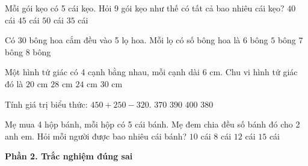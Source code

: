 \begin{ex} %
Mỗi gói kẹo có 5 cái kẹo. Hỏi 9 gói kẹo như thế có tất cả bao nhiêu cái kẹo?
\choice
{$40$ cái}
{\True $45$ cái}
{$50$ cái}
{$35$ cái}
\end{ex}

\begin{ex} %
Có 30 bông hoa cắm đều vào 5 lọ hoa. Mỗi lọ có số bông hoa là
\choice
{\True $6$ bông}
{$5$ bông}
{$7$ bông}
{$8$ bông}
\end{ex}

\begin{ex} %
Một hình tứ giác có 4 cạnh bằng nhau, mỗi cạnh dài $6\text{ cm}$. Chu vi hình tứ giác đó là
\choice
{$20\text{ cm}$}
{$28\text{ cm}$}
{\True $24\text{ cm}$}
{$30\text{ cm}$}
\end{ex}

\begin{ex} %
Tính giá trị biểu thức: $450 + 250 - 320$.
\choice
{$370$}
{$390$}
{$400$}
{\True $380$}
\end{ex}

\begin{ex} %
Mẹ mua 4 hộp bánh, mỗi hộp có 5 cái bánh. Mẹ đem chia đều số bánh đó cho 2 anh em. Hỏi mỗi người được bao nhiêu cái bánh?
\choice
{\True $10$ cái}
{$8$ cái}
{$12$ cái}
{$15$ cái}
\end{ex}

\textbf{Phần 2. Trắc nghiệm đúng sai}

